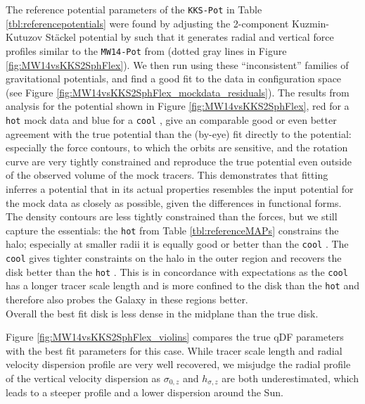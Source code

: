 The reference potential parameters  of the \texttt{KKS-Pot} in Table \ref{tbl:referencepotentials} were found by adjusting the 2-component Kuzmin-Kutuzov St\"{a}ckel potential by \citet{1994AA...287...43B} such that it generates radial and vertical force profiles similar to the \texttt{MW14-Pot} from \citet{2015ApJS..216...29B} (dotted gray lines in Figure \ref{fig:MW14vsKKS2SphFlex}). We then run \RM{} using these ``inconsistent'' families of gravitational potentials, and find a good fit to the data in configuration space (see Figure \ref{fig:MW14vsKKS2SphFlex_mockdata_residuals}). The results from \RM{} analysis for the potential shown in Figure \ref{fig:MW14vsKKS2SphFlex}, red for a \texttt{hot} mock data \MAP{} and blue for a \texttt{cool} \MAP{}, give an comparable good or even better agreement with the true potential than the (by-eye) fit directly to the potential: especially the force contours, to which the orbits are sensitive, and the rotation curve are very tightly constrained and reproduce the true potential even outside of the observed volume of the mock tracers. This demonstrates that \RM{} fitting inferres a potential that in its actual properties resembles the input potential for the mock data as closely as possible, given the differences in functional forms.
\\The density contours are less tightly constrained than the forces, but we still capture the essentials: the \texttt{hot} \MAP{} from Table \ref{tbl:referenceMAPs} constrains the halo; especially at smaller radii it is equally good or better than the \texttt{cool} \MAP{}. The \texttt{cool} \MAP{} gives tighter constraints on the halo in the outer region and recovers the disk better than the \texttt{hot} \MAP{}. This is in concordance with expectations as the \texttt{cool} \MAP{} has a longer tracer scale length and is more confined to the disk than the \texttt{hot} \MAP{} and therefore also probes the Galaxy in these regions better.
\\Overall the best fit disk is less dense in the midplane than the true disk. 


Figure \ref{fig:MW14vsKKS2SphFlex_violins} compares the true qDF parameters with the best fit parameters for this case. While tracer scale length and radial velocity dispersion profile are very well recovered, we misjudge the radial profile of the vertical velocity dispersion as $\sigma_{0,z}$ and $h_{\sigma,z}$ are both underestimated, which leads to a steeper profile and a lower dispersion around the Sun.






